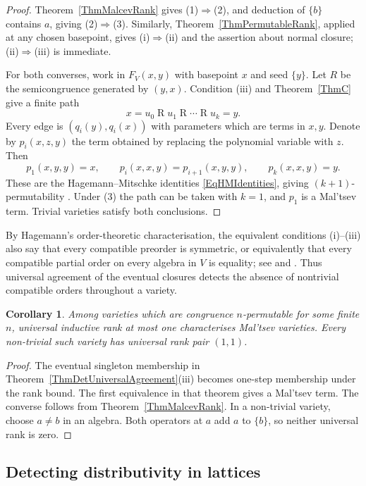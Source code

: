 \documentclass[12pt,english]{amsart}
\newtheorem{corollary}[theorem]{Corollary}
\theoremstyle{definition}
\numberwithin{equation}{section}
\theoremstyle{remark}
\begin{document}
\begin{proof}
Theorem~\ref{ThmMalcevRank} gives (1)$\Rightarrow$(2), and
deduction of $\{b\}$ contains $a$, giving (2)$\Rightarrow$(3).
Similarly, Theorem~\ref{ThmPermutableRank}, applied at any chosen
basepoint, gives (i)$\Rightarrow$(ii) and the assertion about normal
closure; (ii)$\Rightarrow$(iii) is immediate.

For both converses, work in $F_V(x,y)$ with basepoint $x$ and seed
$\{y\}$. Let $R$ be the semicongruence generated by $(y,x)$.
Condition (iii) and Theorem~\ref{ThmC} give a finite path
\[
x=u_0\mathrel R u_1\mathrel R\cdots\mathrel R u_k=y.
\]
Every edge is $(q_i(y),q_i(x))$ with parameters which are terms
in $x,y$. Denote by $p_i(x,z,y)$ the term obtained by replacing
the polynomial variable with $z$. Then
\[
p_1(x,y,y)=x,\qquad
p_i(x,x,y)=p_{i+1}(x,y,y),\qquad
p_k(x,x,y)=y.
\]
These are the Hagemann--Mitschke identities
\eqref{EqHMIdentities}, giving $(k+1)$-permutability
\cite{HM73}. Under (3) the path can be taken with $k=1$, and
$p_1$ is a Mal'tsev term. Trivial varieties satisfy both conclusions.
\end{proof}

By Hagemann's order-theoretic characterisation, the equivalent
conditions (i)--(iii) also say that every compatible preorder is
symmetric, or equivalently that every compatible partial order on
every algebra in $V$ is equality; see
\cite[Theorem 5.1]{DetCS13} and \cite{JRV14}. Thus universal
agreement of the eventual closures detects the absence of
nontrivial compatible orders throughout a variety.

\begin{corollary}\label{CorDetPermutableRankOne}
Among varieties which are congruence $n$-permutable for some finite
$n$, universal inductive rank at most one characterises Mal'tsev
varieties. Every non-trivial such variety has universal rank
pair $(1,1)$.
\end{corollary}

\begin{proof}
The eventual singleton membership in
Theorem~\ref{ThmDetUniversalAgreement}(iii) becomes one-step
membership under the rank bound. The first equivalence in that
theorem gives a Mal'tsev term. The converse follows from
Theorem~\ref{ThmMalcevRank}. In a non-trivial variety, choose
$a\ne b$ in an algebra. Both operators at $a$ add $a$ to $\{b\}$,
so neither universal rank is zero.
\end{proof}


\subsection{Detecting distributivity in lattices}\label{DetSubsecLattices}
\end{document}
